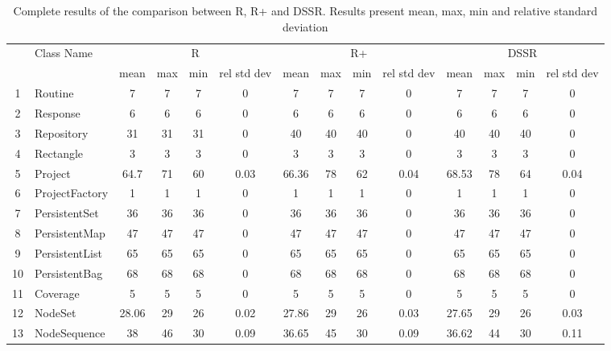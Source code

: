 \documentclass[conference]{IEEEtran}
\begin{document}
\begin{table} [h!] {
  \scriptsize
 \caption{Complete results of the comparison between R, R+ and DSSR. Results present mean, max, min and relative standard deviation}
    \begin{tabular}{c l c c c c c c c c c c c c}
      \multirow{2}{*}{}		& \multirow{2}{*}{Class Name}		& \multicolumn{4}{c}{R}							&	\multicolumn{4}{c}{R+}							&	\multicolumn{4}{c}{DSSR}	\\
      						&							& mean & max & min & rel std dev				& mean 	& max 	& min 	& rel std dev 		& mean 		& 	max 		&	 min 		& rel std dev \\
     
 1						& Routine						& 7	&	7	&	7	& 		0					& 7		&  7		& 7		& 		0			& 7			& 7			& 7			&	0	\\
 2						& Response					& 6	&	6	&	6	& 		0					& 6		&  6		& 6		& 		0			& 6			& 6			& 6			&	0	\\
 3						& Repository					& 31	&	31	&	31	& 		0					& 40		&  40		& 40		& 		0			& 40			& 40			& 40			&	0	\\      
 4						& Rectangle					& 3	&	3	&	3	& 		0					& 3		&  3 		& 3		& 		0			& 3			& 3			& 3			&	0	\\      
 5						& Project						& 64.7&	71	&	60	& 		0.03					& 66.36	&  78		& 62		& 		0.04			& 68.53		& 78			& 64			&	0.04	\\      
 6						& ProjectFactory				& 1	&	1	&	1	& 		0					& 1		&  1		& 1		& 		0			& 1			& 1			& 1			&	0	\\      
 7						& PersistentSet					& 36	&	36	&	36	& 		0					& 36		&  36		& 36		& 		0			& 36			& 36			& 36 			&	0	\\      
 8						& PersistentMap				& 47	&	47	&	47	& 		0					& 47		&  47		& 47		& 		0			& 47			& 47			& 47			&	0	\\      
 9						& PersistentList					& 65	&	65	&	65	& 		0					& 65		&  65		& 65		& 		0			& 65			& 65			& 65			&	0	\\      
 10						& PersistentBag				& 68	&	68	&	68	& 		0					& 68		&  68		& 68		& 		0			& 68			& 68			& 68			&	0	\\      
 11						& Coverage					& 5	&	5	&	5	& 		0					& 5		& 5		& 5		& 		0			& 5			& 5			& 5			&	0	\\      
 12						& NodeSet					& 28.06&	29	&	26	& 		0.02					& 27.86	& 29 		& 26		& 		0.03			& 27.65		& 29			& 26			&	0.03	\\      
 13						& NodeSequence				& 38	&	46	&	30	& 		0.09					& 36.65	& 45 		& 30		& 		0.09			& 36.62		& 44			& 30			&	0.11	\\      

\end{tabular}}
\end{table}
\end{document}
